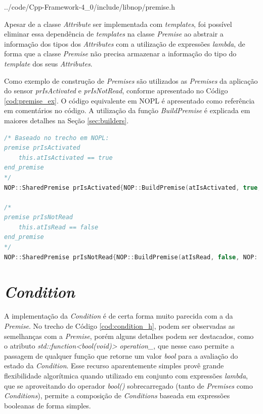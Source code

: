 
            {../code/Cpp-Framework-4_0/include/libnop/premise.h}

Apesar de a classe \textit{Attribute} ser implementada com \textit{templates},
foi possível eliminar essa dependência de \textit{templates} na classe
\textit{Premise} ao abstrair a informação dos tipos dos \textit{Attributes} com
a utilização de expressões \textit{lambda}, de forma que a classe
\textit{Premise} não precisa armazenar a informação do tipo do \textit{template}
dos seus \textit{Attributes}.

Como exemplo de construção de \textit{Premises} são utilizados as
\textit{Premises} da aplicação do sensor \textit{prIsActivated} e
\textit{prIsNotRead}, conforme apresentado no Código \ref{cod:premise_ex}. O
código equivalente em NOPL é apresentado como referência em comentários no
código. A utilização da função \textit{BuildPremise} é explicada em maiores
detalhes na Seção \ref{sec:builders}.

\begin{lstlisting}[language=C++, float=htb,
    caption = {Criação de \textit{Premises} no \textit{Framework} PON C++ 4.0},
    source = {Autoria própria},
    label ={cod:premise_ex}]
/* Baseado no trecho em NOPL:
premise prIsActivated
    this.atIsActivated == true
end_premise
*/
NOP::SharedPremise prIsActivated{NOP::BuildPremise(atIsActivated, true, NOP::Equal())};

/*
premise prIsNotRead
    this.atIsRead == false
end_premise
*/
NOP::SharedPremise prIsNotRead{NOP::BuildPremise(atIsRead, false, NOP::Equal())};
\end{lstlisting}

\section{\textit{Condition}}\label{sec:condition}

A implementação da \textit{Condition} é de certa forma muito parecida com a da
\textit{Premise}. No trecho de Código \ref{cod:condition_h}, podem ser
observadas as semelhanças com a \textit{Premise}, porém alguns detalhes podem
ser destacados, como o atributo \textit{std::function<bool(void)> operation\_},
que nesse caso permite a passagem de qualquer função que retorne um valor
\textit{bool} para a avaliação do estado da \textit{Condition}. Esse recurso
aparentemente simples provê grande flexibilidade algorítmica quando utilizado em
conjunto com expressões \textit{lambda}, que se aproveitando do operador
\textit{bool()} sobrecarregado (tanto de \textit{Premises} como
\textit{Conditions}), permite a composição de \textit{Conditions} baseada em
expressões booleanas de forma simples.

